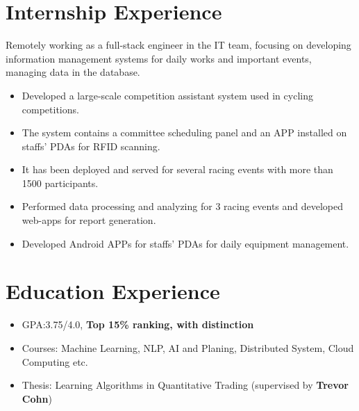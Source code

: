 \documentclass{resume_en}
\begin{document}
\section{Internship Experience}
Remotely working as a full-stack engineer in the IT team, focusing on developing information management systems for daily works and important events, managing data in the database.
\begin{itemize}
  \item Developed a large-scale competition assistant system used in cycling competitions.
  \item The system contains a committee scheduling panel and an APP installed on staffs' PDAs for RFID scanning.
  \item It has been deployed and served for several racing events with more than 1500 participants.
  \item Performed data processing and analyzing for 3 racing events and developed web-apps for report generation.
  \item Developed Android APPs for staffs' PDAs for daily equipment management.
\end{itemize}


\section{Education Experience}

\begin{itemize}
    \item GPA:3.75/4.0, \textbf{Top 15\% ranking, with distinction}
    \item Courses: Machine Learning, NLP, AI and Planing, Distributed System, Cloud Computing etc.
    \item Thesis: Learning Algorithms in Quantitative Trading (supervised by \textbf{Trevor Cohn})
\end{itemize}
\end{document}
